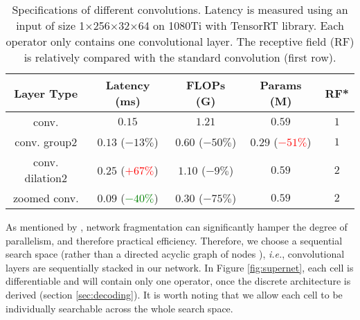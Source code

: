 \documentclass{article} \usepackage{iclr2020_conference,times}
\begin{document}
\begin{wraptable}{r}{90mm}
\vspace{-1.5em}
\scriptsize
\begin{center}
\caption{Specifications of different convolutions. Latency is measured using an input of size 1$\times$256$\times$32$\times$64 on 1080Ti with TensorRT library. Each operator only contains one convolutional layer. The receptive field (RF) is relatively compared with the standard convolution (first row).}
\begin{tabular}{ccccc}
\toprule
Layer Type & Latency (ms) & FLOPs (G) & Params (M) & RF* \\ \midrule
conv. & $0.15$ & $1.21$ & $0.59$ & $1$ \\
conv. group2 & $0.13$ ($-13\%$) & $0.60$ ($-50\%$) & $0.29$ (\textcolor{red}{$-51\%$}) & $1$ \\
conv. dilation2 & $0.25$ (\textcolor{red}{$+67\%$}) & $1.10$ ($-9\%$) & $0.59$ & $2$ \\
zoomed conv. & $0.09$ (\textcolor{green}{$-40\%$}) & $0.30$ ($-75\%$) & $0.59$ & $2$ \\ \bottomrule
\end{tabular}\label{table:ops}
\end{center}
\vspace{-1em}
\end{wraptable}

As mentioned by \citet{ma2018shufflenet}, network fragmentation can significantly hamper the degree of parallelism, and therefore practical efficiency. Therefore, we choose a sequential search space (rather than a directed acyclic graph of nodes \citep{liu2018darts}), \textit{i.e.}, convolutional layers are sequentially stacked in our network. In Figure \ref{fig:supernet}, each cell is differentiable \citep{liu2018darts,liu2019auto} and will contain only one operator, once the discrete architecture is derived (section \ref{sec:decoding}). It is worth noting that we allow each cell to be individually searchable across the whole search space.\vspace{-0.5em}
\end{document}
